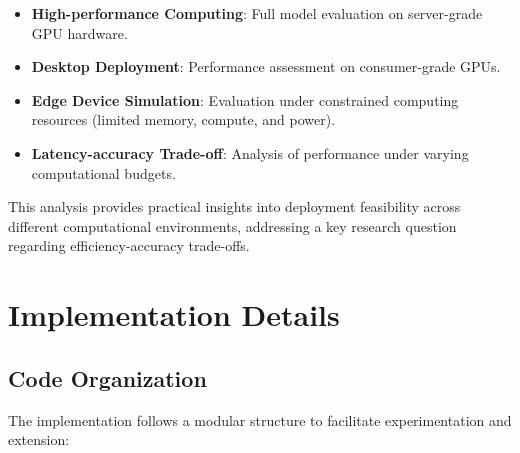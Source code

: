 \begin{itemize}
    \item \textbf{High-performance Computing}: Full model evaluation on server-grade GPU hardware.
    
    \item \textbf{Desktop Deployment}: Performance assessment on consumer-grade GPUs.
    
    \item \textbf{Edge Device Simulation}: Evaluation under constrained computing resources (limited memory, compute, and power).
    
    \item \textbf{Latency-accuracy Trade-off}: Analysis of performance under varying computational budgets.
\end{itemize}

This analysis provides practical insights into deployment feasibility across different computational environments, addressing a key research question regarding efficiency-accuracy trade-offs.

\section{Implementation Details}

\subsection{Code Organization}
The implementation follows a modular structure to facilitate experimentation and extension:

